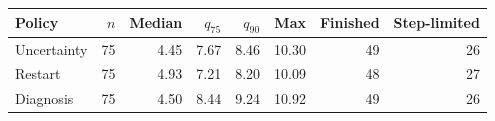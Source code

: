 \begin{tabular}{@{}lrrrrrrr@{}}
\toprule
Policy & $n$ & Median & $q_{75}$ & $q_{90}$ & Max & Finished & Step-limited \\
\midrule
Uncertainty & 75 & 4.45 & 7.67 & 8.46 & 10.30 & 49 & 26 \\
Restart & 75 & 4.93 & 7.21 & 8.20 & 10.09 & 48 & 27 \\
Diagnosis & 75 & 4.50 & 8.44 & 9.24 & 10.92 & 49 & 26 \\
\bottomrule
\end{tabular}
